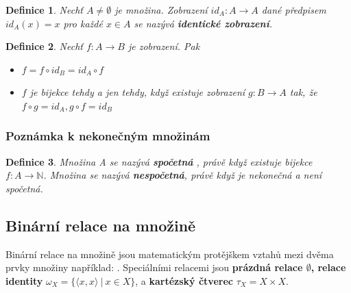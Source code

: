 \documentclass[12pt,a4paper]{article}
\newtheorem{definition}{Definice}
\begin{document}
\begin{definition}
	Nechť $A \not= \emptyset$ je množina. Zobrazení $id_A : A \rightarrow A$ dané předpisem $id_A(x) = x$ pro každé $x \in A$ se nazývá \textbf{identické zobrazení}.
\end{definition}

\begin{definition}
	Nechť $f : A \rightarrow B$ je zobrazení. Pak
	\begin{itemize}
		\item[a)] $f = f \circ id_B = id_A \circ f$
		\item[b)] $f$ je bijekce tehdy a jen tehdy, když existuje zobrazení $g : B \rightarrow A$ tak, že $f \circ g = id_A, g \circ f = id_B$
	\end{itemize}
\end{definition}


\subsubsection{Poznámka k nekonečným množinám}
\begin{definition}
	Množina A se nazývá \textbf{spočetná} , právě když existuje bijekce $f : A \rightarrow \mathbb{N}$. Množina se nazývá \textbf{nespočetná}, právě když je nekonečná a není spočetná.
\end{definition}

\subsection{Binární relace na množině}
Binární relace na množině jsou matematickým protějškem vztahů mezi dvěma prvky množiny například: . Speciálními relacemi jsou \textbf{prázdná relace $\emptyset$, relace identity} $\omega_X = \{ \langle x, x \rangle \ | \ x \in X \}$, a \textbf{kartézský čtverec} $\tau_X = X \times X$.
\end{document}
